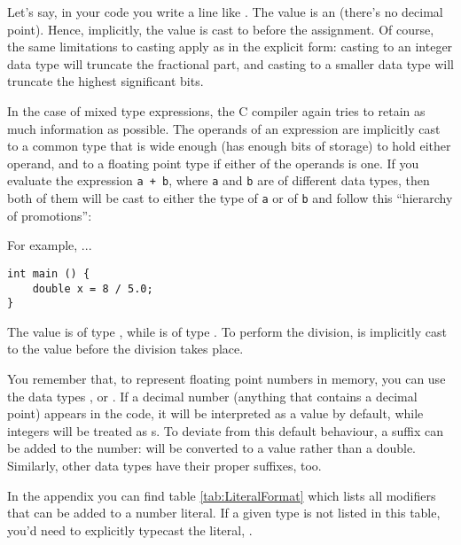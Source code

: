 {Let's say, in your code you write a line like . The value  is an  (there's no decimal point). Hence, implicitly, the value  is cast to  before the assignment. Of course, the same limitations to casting apply as in the explicit form: casting to an integer data type will truncate the fractional part, and casting to a smaller data type will truncate the highest significant bits.

In the case of mixed type expressions, the C compiler again tries to retain as much information as possible. The operands of an expression are implicitly cast to a common type that is wide enough (has enough bits of storage) to hold either operand, and to a floating point type if either of the operands is one. If you evaluate the expression \texttt{a + b}, where \texttt{a} and \texttt{b} are of different data types, then both of them will be cast to either the type of \texttt{a} or of \texttt{b} and follow this \enquote{hierarchy of promotions}:
\begin{center}
\end{center}

For example, ...
\begin{codebox}[promotion.c]
\begin{verbatim}
int main () {
    double x = 8 / 5.0;
}
\end{verbatim}
\end{codebox}

The value  is of type , while  is of type . To perform the division,  is implicitly cast to the  value  before the division takes place.

\begin{plusbox}
You remember that, to represent floating point numbers in memory, you can use the data types ,  or . If a decimal number (anything that contains a decimal point) appears in the code, it will be interpreted as a  value by default, while integers will be treated as s. To deviate from this default behaviour, a suffix can be added to the number:  will be converted to a  value rather than a double. Similarly, other data types have their proper suffixes, too.

In the appendix you can find table \ref{tab:LiteralFormat} which lists all modifiers that can be added to a number literal. If a given type is not listed in this table, you'd need to explicitly typecast the literal, \eg {}.
\end{plusbox}

}
